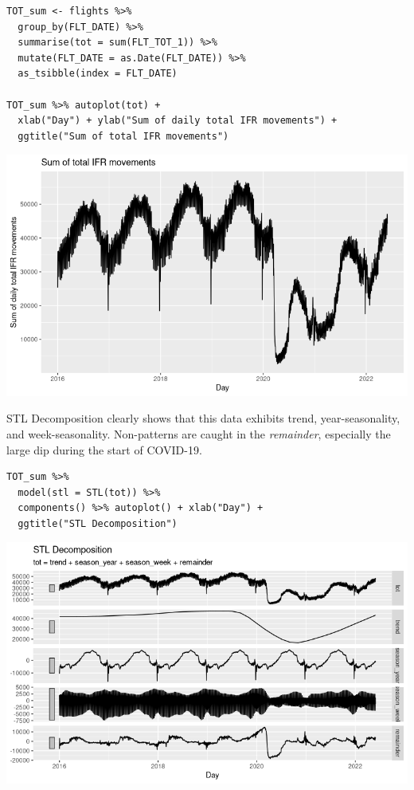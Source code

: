 \documentclass[8pt]{article}
\begin{document}
\begin{verbatim}
TOT_sum <- flights %>%
  group_by(FLT_DATE) %>%
  summarise(tot = sum(FLT_TOT_1)) %>%
  mutate(FLT_DATE = as.Date(FLT_DATE)) %>%
  as_tsibble(index = FLT_DATE)

TOT_sum %>% autoplot(tot) +
  xlab("Day") + ylab("Sum of daily total IFR movements") +
  ggtitle("Sum of total IFR movements")
\end{verbatim}

\begin{center}
\includegraphics[width=.9\linewidth]{./media/tot_sum.png}
\end{center}

\begin{latex}
\pagebreak
\end{latex}

STL Decomposition clearly shows that this data exhibits trend, year-seasonality, and week-seasonality. Non-patterns are caught in the \emph{remainder}, especially the large dip during the start of COVID-19.

\begin{verbatim}
TOT_sum %>%
  model(stl = STL(tot)) %>%
  components() %>% autoplot() + xlab("Day") +
  ggtitle("STL Decomposition")
\end{verbatim}

\begin{center}
\includegraphics[width=.9\linewidth]{./media/tot_sum_decomp.png}
\end{center}
\end{document}

